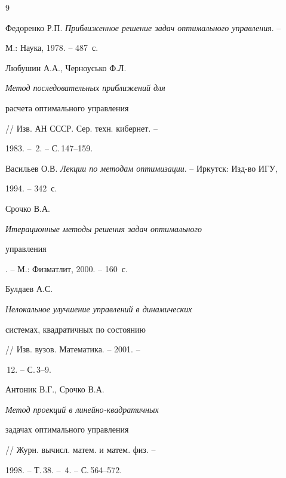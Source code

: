 \begin{thebibliography}{9}







Федоренко Р.П. {\em Приближенное решение задач оптимального управления}. --


М.: Наука, 1978. -- 487~с.




Любушин А.А., Черноусько Ф.Л. {\em Метод последовательных приближений для


расчета оптимального управления} // Изв. АН СССР. Сер. техн. кибернет. --


1983. -- \No\,2. -- С.\,147--159.




Васильев О.В. {\em Лекции по методам оптимизации}. -- Иркутск: Изд-во ИГУ,


1994. -- 342~с.




Срочко В.А. {\em Итерационные методы решения задач оптимального


управления}. -- М.: Физматлит, 2000. -- 160~с.




Булдаев А.С. {\em Нелокальное улучшение управлений в динамических


системах, квадратичных по состоянию} // Изв. вузов. Математика. -- 2001. --


\No\,12. -- С.\,3--9.




Антоник В.Г., Срочко В.А. {\em Метод проекций в линейно-квадратичных


задачах оптимального управления} // Журн. вычисл. матем. и матем. физ. --


1998. -- Т.\,38. -- \No\,4. -- С.\,564--572.





\end{thebibliography}





\vskip 2cm












\label{end}











 




















